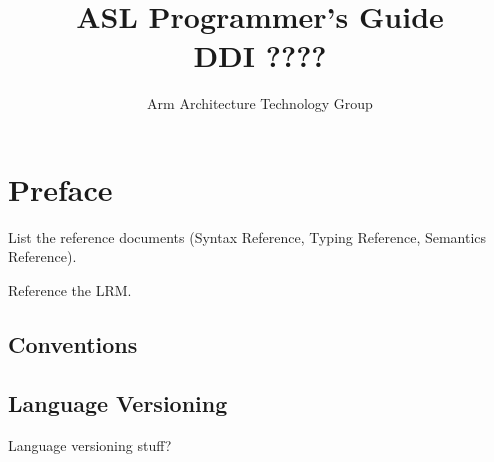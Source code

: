 \documentclass{book}
\author{Arm Architecture Technology Group}
\title{ASL Programmer's Guide \\
       DDI ????}
\begin{document}
\maketitle

\tableofcontents{}





\chapter{Preface}
List the reference documents (Syntax Reference, Typing Reference, Semantics Reference).

Reference the LRM.

\section{Conventions}

\section{Language Versioning}
Language versioning stuff?

\end{document}
